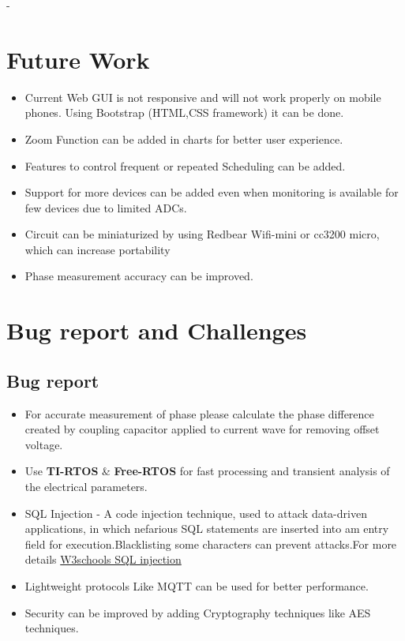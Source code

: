\documentclass[a4paper,12pt,oneside]{book}
\begin{document}
\begin{itemize}
	
	-
\end{itemize}
\newpage
\section{Future Work}
\begin{itemize}
	\item{Current Web GUI is not responsive and will not work properly on mobile phones. Using Bootstrap (HTML,CSS framework) it can be done.}
	\item{Zoom Function can be added in charts for better user experience.}
	\item{Features to control frequent or repeated Scheduling can be added.}
	\item {Support for more devices can be added even when monitoring is available for few devices due to limited ADCs. }
	\item{Circuit can be miniaturized by using Redbear Wifi-mini or cc3200 micro, which can increase portability}
	\item{Phase measurement accuracy can be improved.}
	
\end{itemize}
\newpage
\section{Bug report and Challenges}
\subsection*{Bug report}
\begin{itemize}
	\item For accurate measurement of phase please calculate the phase difference created by coupling capacitor applied to current wave for removing offset voltage.
	\item Use \textbf{TI-RTOS} \& \textbf{Free-RTOS} for fast processing and transient analysis of the electrical parameters.
	\item{SQL Injection - A code injection technique, used to attack data-driven applications, in which nefarious SQL statements are inserted into am entry field for execution.Blacklisting some characters can prevent attacks.For more details \href{www.w3schools.com/sql/sql_injection.asp}{W3schools SQL injection} }
	\item{Lightweight protocols Like MQTT can be used for better performance.}
	\item{Security can be improved by adding Cryptography techniques like AES techniques.}
\end{itemize}
\end{document}
